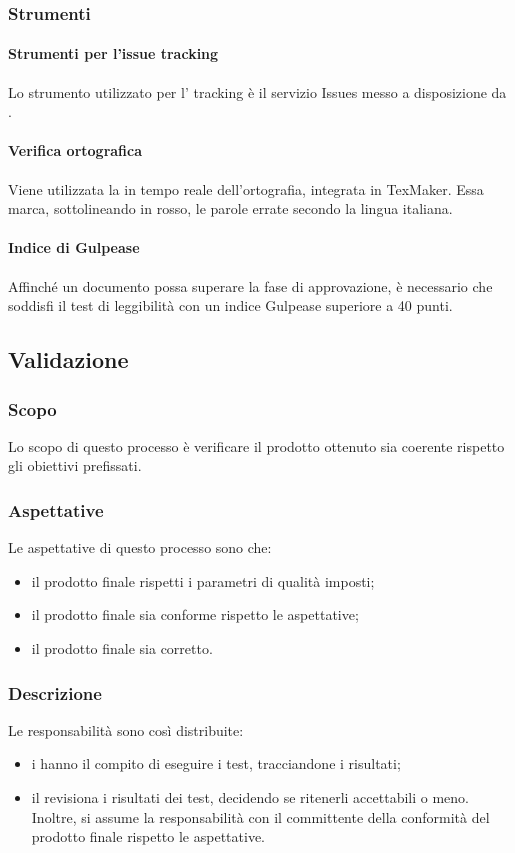 \subsubsection{Strumenti}
\paragraph{Strumenti per l'issue tracking}
Lo strumento utilizzato per l' tracking è il servizio Issues messo a disposizione da .
\paragraph{Verifica ortografica}
Viene utilizzata la  in tempo reale dell'ortografia, integrata in TexMaker. Essa marca,
sottolineando in rosso, le parole errate secondo la lingua italiana.
\paragraph{Indice di Gulpease}
Affinché un documento possa superare la fase di approvazione, è necessario che soddisfi il test di leggibilità con un indice Gulpease superiore a 40 punti.
 \subsection{Validazione}
 \subsubsection{Scopo}
 Lo scopo di questo processo è verificare il prodotto ottenuto sia coerente rispetto gli obiettivi prefissati.
 \subsubsection{Aspettative}
 Le aspettative di questo processo sono che:
 \begin{itemize}
 	\item il prodotto finale rispetti i parametri di qualità imposti;
 	\item il prodotto finale sia conforme rispetto le aspettative;
 	\item il prodotto finale sia corretto.
 \end{itemize}
 \subsubsection{Descrizione}
 Le responsabilità sono così distribuite:
 \begin{itemize}
 	\item i \VERP{} hanno il compito di eseguire i test, tracciandone i risultati;
 	\item il \RESP{} revisiona i risultati dei test, decidendo se ritenerli accettabili o meno. Inoltre, si assume la responsabilità con il committente della conformità del prodotto finale rispetto le aspettative.
 \end{itemize}
